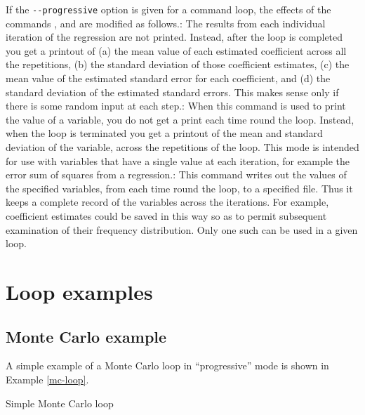 If the \verb+--progressive+ option is given for a command loop, the
effects of the commands ,  and  are
modified as follows.: The results from each individual
iteration of the regression are not printed.  Instead, after the loop
is completed you get a printout of (a) the mean value of each
estimated coefficient across all the repetitions, (b) the standard
deviation of those coefficient estimates, (c) the mean value of the
estimated standard error for each coefficient, and (d) the standard
deviation of the estimated standard errors.  This makes sense only if
there is some random input at each step.: When this command
is used to print the value of a variable, you do not get a print each
time round the loop.  Instead, when the loop is terminated you get a
printout of the mean and standard deviation of the variable, across
the repetitions of the loop.  This mode is intended for use with
variables that have a single value at each iteration, for example the
error sum of squares from a regression.: This command
writes out the values of the specified variables, from each time round
the loop, to a specified file.  Thus it keeps a complete record of the
variables across the iterations.  For example, coefficient estimates
could be saved in this way so as to permit subsequent examination of
their frequency distribution. Only one such  can be used in
a given loop.

\section{Loop examples}
\label{loop-examples}



\subsection{Monte Carlo example}
\label{loop-mc-example}

A simple example of a Monte Carlo loop in ``progressive'' mode is
shown in Example \ref{mc-loop}.

\begin{script}[htbp]
  \caption{Simple Monte Carlo loop}
  \label{mc-loop}

\end{script}

